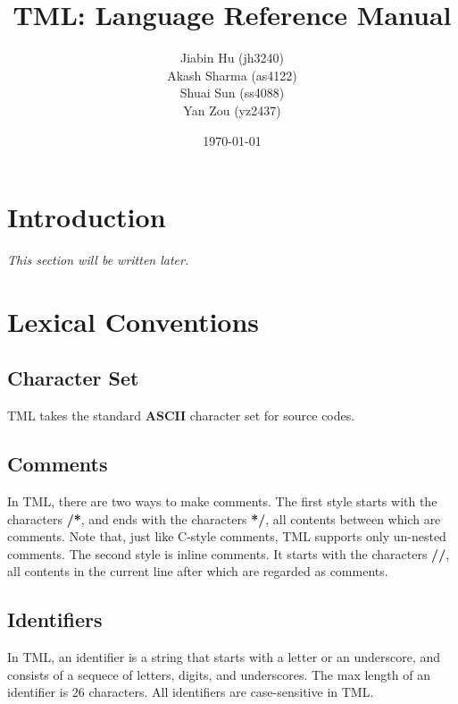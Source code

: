 \documentclass[12pt,psfig,a4]{article}
\begin{document}
 
\pagestyle{plain} 

\newenvironment{code}
{\hangindent=0.7cm\itshape\sffamily\parskip 7.2pt}
{\parskip 7.2pt}

\title{TML: Language Reference Manual}
\author{
Jiabin Hu (jh3240)\\
Akash Sharma (as4122)\\
Shuai Sun (ss4088)\\
Yan Zou (yz2437)
}
\date{\today}
\maketitle





\section{Introduction}

\textit{This section will be written later.}

\section{Lexical Conventions}

\subsection{Character Set}
TML takes the standard \textbf{ASCII} character set for source codes.

\subsection{Comments}
In TML, there are two ways to make comments. The first style starts with the characters \textbf{/*}, and ends with the characters \textbf{*/}, all contents between which are comments. Note that, just like C-style comments, TML supports only un-nested comments. The second style is inline comments. It starts with the characters \textbf{//}, all contents in the current line after which are regarded as comments.

\subsection{Identifiers}
In TML, an identifier is a string that starts with a letter or an underscore, and consists of a sequece of letters, digits, and underscores. The max length of an identifier is 26 characters. 
All identifiers are case-sensitive in TML.
\end{document}
